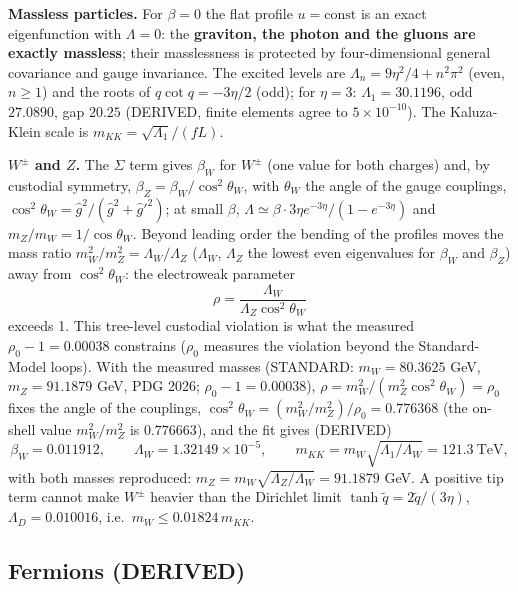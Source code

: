 \documentclass[
  10pt,
]{article}
\begin{document}
\textbf{Massless particles.} For \(\beta = 0\) the flat profile
\(u = \text{const}\) is an exact eigenfunction with \(\Lambda = 0\): the
\textbf{graviton, the photon and the gluons are exactly massless}; their
masslessness is protected by four-dimensional general covariance and
gauge invariance. The excited levels are
\(\Lambda_n = 9\eta^2/4 + n^2\pi^2\) (even, \(n \ge 1\)) and the roots
of \(q\cot q = -3\eta/2\) (odd); for \(\eta = 3\):
\(\Lambda_1 = 30.1196\), odd \(27.0890\), gap \(20.25\) (DERIVED, finite
elements agree to \(5\times10^{-10}\)). The Kaluza-Klein scale is
\(m_{KK} = \sqrt{\Lambda_1}/(fL)\).

\textbf{\(W^\pm\) and \(Z\).} The \(\Sigma\) term gives \(\beta_W\) for
\(W^\pm\) (one value for both charges) and, by custodial symmetry,
\(\beta_Z = \beta_W/\cos^2\theta_W\), with \(\theta_W\) the angle of the
gauge couplings, \(\cos^2\theta_W = \hat g^2/(\hat g^2 + \hat g'^2)\);
at small \(\beta\),
\(\Lambda \simeq \beta\cdot 3\eta e^{-3\eta}/(1 - e^{-3\eta})\) and
\(m_Z/m_W = 1/\cos\theta_W\). Beyond leading order the bending of the
profiles moves the mass ratio \(m_W^2/m_Z^2 = \Lambda_W/\Lambda_Z\)
(\(\Lambda_W\), \(\Lambda_Z\) the lowest even eigenvalues for
\(\beta_W\) and \(\beta_Z\)) away from \(\cos^2\theta_W\): the
electroweak parameter
\[ \rho = \frac{\Lambda_W}{\Lambda_Z\cos^2\theta_W} \] exceeds 1. This
tree-level custodial violation is what the measured
\(\rho_0 - 1 = 0.00038\) constrains (\(\rho_0\) measures the violation
beyond the Standard-Model loops). With the measured masses (STANDARD:
\(m_W = 80.3625\) GeV, \(m_Z = 91.1879\) GeV, PDG 2026;
\(\rho_0 - 1 = 0.00038\)),
\(\rho = m_W^2/(m_Z^2\cos^2\theta_W) = \rho_0\) fixes the angle of the
couplings, \(\cos^2\theta_W = (m_W^2/m_Z^2)/\rho_0 = 0.776368\) (the
on-shell value \(m_W^2/m_Z^2\) is \(0.776663\)), and the fit gives
(DERIVED)
\[ \beta_W = 0.011912,\qquad \Lambda_W = 1.32149\times10^{-5},\qquad m_{KK} = m_W\sqrt{\Lambda_1/\Lambda_W} = 121.3\ \text{TeV}, \]
with both masses reproduced:
\(m_Z = m_W\sqrt{\Lambda_Z/\Lambda_W} = 91.1879\) GeV. A positive tip
term cannot make \(W^\pm\) heavier than the Dirichlet limit
\(\tanh\tilde q = 2\tilde q/(3\eta)\), \(\Lambda_D = 0.010016\),
i.e.~\(m_W \le 0.01824\,m_{KK}\).

\hypertarget{fermions-derived}{%
\subsection{Fermions (DERIVED)}\label{fermions-derived}}
\end{document}

